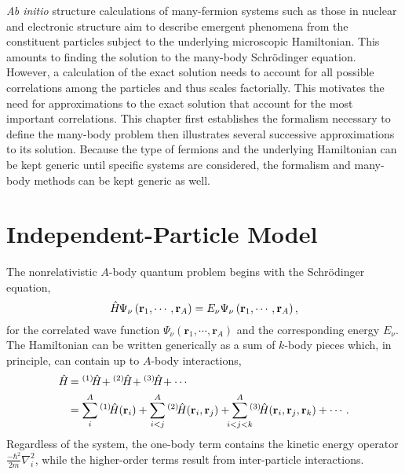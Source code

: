 \documentclass[thesis.tex]{subfiles}
\begin{document}
\emph{Ab initio} structure calculations of many-fermion systems such as those in nuclear and electronic structure aim to describe emergent phenomena from the constituent particles subject to the underlying microscopic Hamiltonian.  This amounts to finding the solution to the many-body Schr\"{o}dinger equation.  However, a calculation of the exact solution needs to account for all possible correlations among the particles and thus scales factorially.  This motivates the need for approximations to the exact solution that account for the most important correlations.  This chapter first establishes the formalism necessary to define the many-body problem then illustrates several successive approximations to its solution.  Because the type of fermions and the underlying Hamiltonian can be kept generic until specific systems are considered, the formalism and many-body methods can be kept generic as well.


\section{Independent-Particle Model}
The nonrelativistic $A$-body quantum problem begins with the Schr\"{o}dinger equation,
\begin{equation} \label{eq:schrodinger}
  \hat{H}\hspace{-1pt}\Psi_{\nu}\left(\mathbf{r}_{1},\cdots,\mathbf{r}_{A}\right) = E_{\nu}\Psi_{\nu}\left(\mathbf{r}_{1},\cdots,\mathbf{r}_{A}\right),
\end{equation}
for the correlated wave function $\Psi_{\nu}\left(\mathbf{r}_{1},\cdots,\mathbf{r}_{A}\right)$ and the corresponding energy $E_{\nu}$.  The Hamiltonian can be written generically as a sum of $k$-body pieces which, in principle, can contain up to $A$-body interactions,
\begin{align} \label{eq:hamiltonian}
  \Ham &= \HamB{1} + \HamB{2} + \HamB{3} + \cdots \notag \\
  &= \sum^{A}_{\mathclap{i}}\HamB{1}\left(\mathbf{r}_{i}\right) + \sum^{A}_{\mathclap{i<j}}\HamB{2}\left(\mathbf{r}_{i},\mathbf{r}_{j}\right) + \sum^{A}_{\mathclap{i<j<k}}\HamB{3}\left(\mathbf{r}_{i},\mathbf{r}_{j},\mathbf{r}_{k}\right) + \cdots.
\end{align}
Regardless of the system, the one-body term contains the kinetic energy operator $\frac{-\hbar^{2}}{2m}\nabla^{2}_{i}$, while the higher-order terms result from inter-particle interactions.
\end{document}

